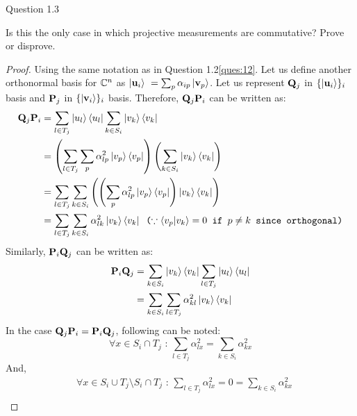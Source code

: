 \begin{solution}{Question 1.3}\label{ques:13}
    \begin{question}
    Is this the only case in which projective measurements are commutative? Prove or disprove.
    \end{question}
    \tcblower{}
    \begin{proof}
    Using the same notation as in Question 1.2\ref{ques:12}. Let us define another orthonormal basis for $\mathbb{C}^n$ as $\ket{\mathbf{u}_i}\ = \sum_p \alpha_{ip}\ket{\mathbf{v}_p}$. Let us represent $\mathbf{Q}_j$ in $\{\ket{\mathbf{u}_i}\}_i$ basis and $\mathbf{P}_j$ in $\{\ket{\mathbf{v}_i}\}_i$ basis. Therefore, $\mathbf{Q}_j \mathbf{P}_i$ can be written as:
    \begin{equation}
        \begin{split}
            \mathbf{Q}_j\mathbf{P}_i &= \sum_{l\in T_j}\ket{u_l}\bra{u_l} \sum_{k\in S_i}\ket{v_k}\bra{v_k} \\ 
            &=\left( \sum_{l\in T_j}\sum_{p}\alpha^2_{lp}\ket{v_p}\bra{v_p} \right) \left( \sum_{k\in S_i} \ket{v_k}\bra{v_k} \right)\\
            &= \sum_{l\in T_j}\sum_{k\in S_i} \left( \left(\sum_{p}\alpha^2_{lp}\ket{v_p}\bra{v_p} \right) \ket{v_k}\bra{v_k} \right)\\
            &= \sum_{l\in T_j} \sum_{k\in S_i}\alpha^2_{lk}\ket{v_k}\bra{v_k} \texttt{ 
        ($\because \braket{v_p|v_k}=0$ if $p\neq k$ since orthogonal)}
        \end{split}
    \end{equation}
    Similarly, $\mathbf{P}_i\mathbf{Q}_j$ can be written as:
    \begin{equation}
        \begin{split}
            \mathbf{P}_i\mathbf{Q}_j &= \sum_{k\in S_i}\ket{v_k}\bra{v_k} \sum_{l\in T_j}\ket{u_l}\bra{u_l}  \\ 
            &= \sum_{k\in S_i}\sum_{l\in T_j} \alpha^2_{kl}\ket{v_k}\bra{v_k}
        \end{split}
    \end{equation}
    In the case $\mathbf{Q}_j\mathbf{P}_i = \mathbf{P}_i\mathbf{Q}_j$, following can be noted:
    \begin{equation}
        \forall x\in S_i\cap T_j \text{ : }\sum_{l\in T_j}\alpha^2_{lx} = \sum_{k\in S_i}\alpha^2_{kx}
    \end{equation}
    And,
    \begin{equation}
        \label{eq:9}
        \begin{split}
            &\forall x\in S_i\cup T_j \setminus S_i\cap T_j \text{ : }\sum_{l\in T_j}\alpha^2_{lx} = 0 = \sum_{k\in S_i}\alpha^2_{kx}\\

\end{split}
\end{equation}
\end{proof}
\end{solution}
